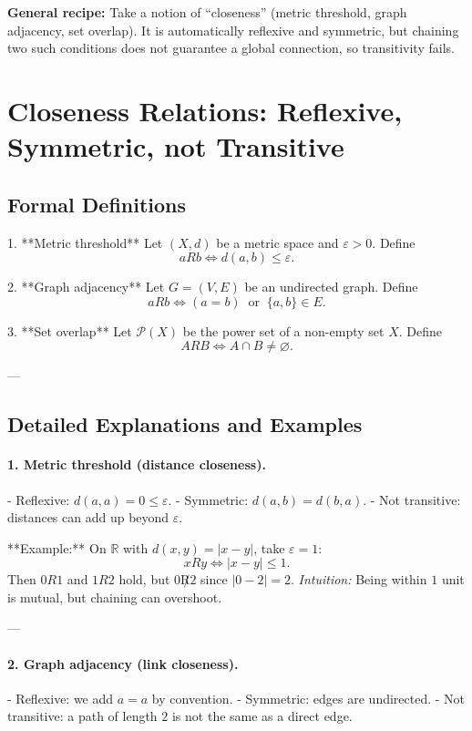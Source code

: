 \documentclass[11pt,a4paper]{article}
\begin{document}
	\bigskip
	\noindent
	\textbf{General recipe:}  
	Take a notion of ``closeness'' (metric threshold, graph adjacency, set overlap).  
	It is automatically reflexive and symmetric, but chaining two such conditions does not guarantee a global connection, so transitivity fails.
	
	\section*{Closeness Relations: Reflexive, Symmetric, not Transitive}
	
	\subsection*{Formal Definitions}
	
	1. **Metric threshold**  
	Let $(X,d)$ be a metric space and $\varepsilon > 0$. Define
	$$
	aRb \iff d(a,b) \leq \varepsilon.
	$$
	
	2. **Graph adjacency**  
	Let $G=(V,E)$ be an undirected graph. Define
	$$
	aRb \iff (a=b) \;\; \text{or} \;\; \{a,b\}\in E.
	$$
	
	3. **Set overlap**  
	Let $\mathcal{P}(X)$ be the power set of a non-empty set $X$. Define
	$$
	A R B \iff A \cap B \neq \varnothing.
	$$
	
	---
	
	\subsection*{Detailed Explanations and Examples}
	
	\paragraph{1. Metric threshold (distance closeness).}  
	- Reflexive: $d(a,a)=0 \leq \varepsilon$.  
	- Symmetric: $d(a,b)=d(b,a)$.  
	- Not transitive: distances can add up beyond $\varepsilon$.  
	
	**Example:** On $\mathbb{R}$ with $d(x,y)=|x-y|$, take $\varepsilon=1$:  
	$$
	xRy \iff |x-y| \leq 1.
	$$
	Then $0R1$ and $1R2$ hold, but $0 \not R 2$ since $|0-2|=2$.  
	\emph{Intuition:} Being within $1$ unit is mutual, but chaining can overshoot.
	
	---
	
	\paragraph{2. Graph adjacency (link closeness).}  
	- Reflexive: we add $a=a$ by convention.  
	- Symmetric: edges are undirected.  
	- Not transitive: a path of length $2$ is not the same as a direct edge.  
	
\end{document}
